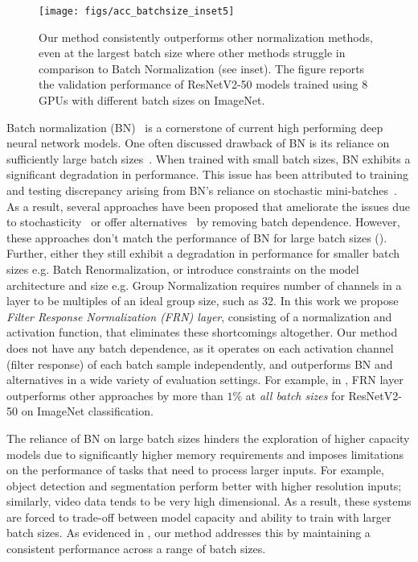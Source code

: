 \documentclass[10pt,twocolumn,letterpaper]{article}
\newcommand{\papername}{FRN}
\newcommand{\batchnorm}{BN}
\begin{document}
\begin{figure}[t]
\begin{center}
   \texttt{[image: figs/acc\_batchsize\_inset5]}
\end{center}
\vspace{-0.5cm}
   \caption{Our method consistently outperforms other normalization methods, even at the largest batch size where other methods struggle in comparison to Batch Normalization (see inset). The figure reports the validation performance of ResNetV2-50 models trained using 8 GPUs with different batch sizes on ImageNet.}
\label{fig:acc_batchsize}
\vspace{-0.5cm}
\end{figure}


Batch normalization (BN)~\cite{batchnorm} is a cornerstone of current high performing deep neural network models. One often discussed drawback of \batchnorm{} is its reliance on sufficiently large batch sizes~\cite{batchrenorm, groupnorm, evalnorm}. When trained with small batch sizes, \batchnorm{} exhibits a significant degradation in performance.
This issue has been attributed to training and testing discrepancy arising from \batchnorm{}'s reliance on stochastic mini-batches~\cite{evalnorm}. As a result, several approaches have been proposed that ameliorate the issues due to stochasticity~\cite{batchrenorm, evalnorm} or offer alternatives~\cite{groupnorm, layernorm} by removing batch dependence.
However, these approaches don't match the performance of \batchnorm{} for large batch sizes (). Further, either they  still exhibit a degradation in performance for smaller batch sizes e.g. Batch Renormalization, or introduce constraints on the model architecture and size e.g. Group Normalization requires number of channels in a layer to be multiples of an ideal group size, such as 32.
In this work we propose \emph{Filter Response Normalization (\papername{}) layer}, consisting of a normalization and activation function, that eliminates these shortcomings altogether. Our method does not have any batch dependence, as it operates on each activation channel (filter response) of each batch sample independently, and outperforms \batchnorm{} and alternatives in a wide variety of evaluation settings. For example, in  , \papername{} layer outperforms other approaches by more than $1\%$ at \emph{all batch sizes} for ResNetV2-50 on ImageNet classification.


The reliance of \batchnorm{} on large batch sizes hinders the exploration of higher capacity models due to significantly higher memory requirements and imposes limitations on the performance of tasks that need to process larger inputs. For example, object detection and segmentation perform better with higher resolution inputs; similarly, video data tends to be very high dimensional. As a result, these systems are forced to trade-off between model capacity and ability to train with larger batch sizes. As evidenced in , our method addresses this by maintaining a consistent performance across a range of batch sizes.
\end{document}
